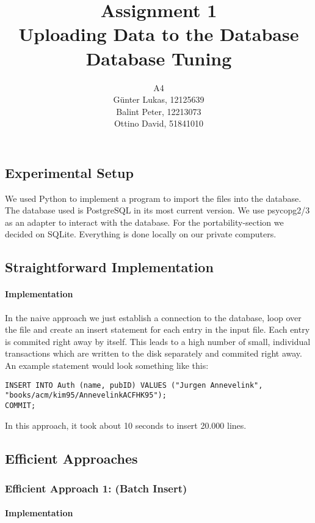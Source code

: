\documentclass[11pt]{scrartcl}
\title{
  \textbf{\large Assignment 1} \\
  Uploading Data to the Database \\
  {\large Database Tuning}}
\author{
  A4 \\
  \large Günter Lukas, 12125639 \\
  \large Balint Peter, 12213073  \\
  \large Ottino David, 51841010
}
\begin{document}
\maketitle

\subsection*{Experimental Setup}

We used Python to implement a program to import the files into the database. The database used is PostgreSQL in its most current version. We use psycopg2/3 as an adapter to interact with the database. For the portability-section we decided on SQLite. Everything is done locally on our private computers.

\subsection*{Straightforward Implementation}

\paragraph{Implementation}

In the naive approach we just establish a connection to the database, loop over the file and create an insert statement for each entry in the input file. Each entry is commited right away by itself. This leads to a high number of small, individual transactions which are written to the disk separately and commited right away. An example statement would look something like this:

\begin{lstlisting}[style=dbtsql]
INSERT INTO Auth (name, pubID) VALUES ("Jurgen Annevelink", 
"books/acm/kim95/AnnevelinkACFHK95");
COMMIT;
\end{lstlisting}

In this approach, it took about 10 seconds to insert 20.000 lines.

\subsection*{Efficient Approaches}

\subsubsection*{Efficient Approach 1: (Batch Insert)}

\paragraph{Implementation}
\end{document}
